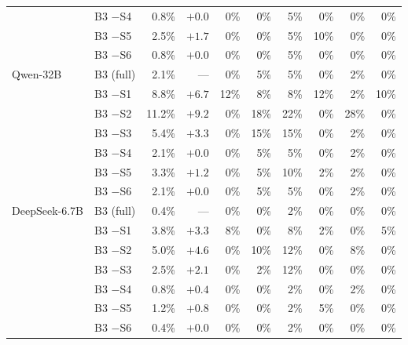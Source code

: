 \begin{table}[t]
{\begin{tabular}{l l r r r r r r r r}
     & B3 $-$S4 & 0.8\% & $+0.0$ & 0\% & 0\% & 5\% & 0\% & 0\% & 0\% \\
     & B3 $-$S5 & 2.5\% & $+1.7$ & 0\% & 0\% & 5\% & 10\% & 0\% & 0\% \\
     & B3 $-$S6 & 0.8\% & $+0.0$ & 0\% & 0\% & 5\% & 0\% & 0\% & 0\% \\
    \midrule
    Qwen-32B & B3 (full) & 2.1\% & — & 0\% & 5\% & 5\% & 0\% & 2\% & 0\% \\
     & B3 $-$S1 & 8.8\% & $+6.7$ & 12\% & 8\% & 8\% & 12\% & 2\% & 10\% \\
     & B3 $-$S2 & 11.2\% & $+9.2$ & 0\% & 18\% & 22\% & 0\% & 28\% & 0\% \\
     & B3 $-$S3 & 5.4\% & $+3.3$ & 0\% & 15\% & 15\% & 0\% & 2\% & 0\% \\
     & B3 $-$S4 & 2.1\% & $+0.0$ & 0\% & 5\% & 5\% & 0\% & 2\% & 0\% \\
     & B3 $-$S5 & 3.3\% & $+1.2$ & 0\% & 5\% & 10\% & 2\% & 2\% & 0\% \\
     & B3 $-$S6 & 2.1\% & $+0.0$ & 0\% & 5\% & 5\% & 0\% & 2\% & 0\% \\
    \midrule
    DeepSeek-6.7B & B3 (full) & 0.4\% & — & 0\% & 0\% & 2\% & 0\% & 0\% & 0\% \\
     & B3 $-$S1 & 3.8\% & $+3.3$ & 8\% & 0\% & 8\% & 2\% & 0\% & 5\% \\
     & B3 $-$S2 & 5.0\% & $+4.6$ & 0\% & 10\% & 12\% & 0\% & 8\% & 0\% \\
     & B3 $-$S3 & 2.5\% & $+2.1$ & 0\% & 2\% & 12\% & 0\% & 0\% & 0\% \\
     & B3 $-$S4 & 0.8\% & $+0.4$ & 0\% & 0\% & 2\% & 0\% & 2\% & 0\% \\
     & B3 $-$S5 & 1.2\% & $+0.8$ & 0\% & 0\% & 2\% & 5\% & 0\% & 0\% \\
     & B3 $-$S6 & 0.4\% & $+0.0$ & 0\% & 0\% & 2\% & 0\% & 0\% & 0\% \\
    \bottomrule
  \end{tabular}
  }
\end{table}